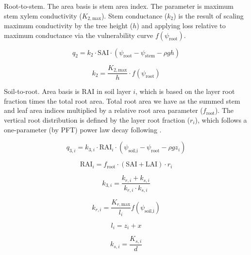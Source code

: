 \documentclass[draft,linenumbers]{agujournal}
\begin{document}
Root-to-stem. The area basis is stem area index. 
The parameter is maximum stem xylem conductivity ($K_{2,\text{max}}$).
Stem conductance ($k_2$) is the result of scaling maximum conductivity by the tree height ($h$)
and applying loss relative to maximum conductance via the vulnerability curve $f\left(\psi_{\text{root}}\right)$. 
\begin{linenomath*} \begin{equation}
q_2 = k_2 \cdot  \text{SAI}  \cdot \left( \psi_{\text{root}}-\psi_{\text{stem}}-\rho g h\right)
\end{equation} \end{linenomath*}
\begin{linenomath*} \begin{equation}
k_2 = \dfrac{K_{2,\text{max}}}{h} \cdot f\left(\psi_{\text{root}}\right)
\end{equation} \end{linenomath*}

Soil-to-root. Area basis is RAI in soil layer $i$, which is based on the layer root fraction times the
total root area. Total root area we have as the summed stem and leaf area indices multiplied by a relative
root area parameter ($f_{\text{root}}$).
The vertical root distribution is defined by the layer root fraction ($r_i$), which follows a one-parameter 
(by PFT) power law decay following \citet{jackson1996}.

\begin{linenomath*} \begin{equation}
q_{3,i} = k_{3,i} \cdot  \text{RAI}_i  \cdot \left( \psi_{\text{soil,i}}-\psi_{\text{root}}-\rho g z_i\right)
\end{equation} \end{linenomath*}
\begin{linenomath*} \begin{equation}
\text{RAI}_i=f_{\text{root}} \cdot \left( \text{SAI} + \text{LAI} \right) \cdot r_i
\label{eq:rai}
\end{equation} \end{linenomath*}
\begin{linenomath*} \begin{equation}
k_{3,i} = \dfrac{k_{r,i}+k_{s,i}}{k_{r,i}\cdot k_{s,i}}
\end{equation} \end{linenomath*}
\begin{linenomath*} \begin{equation}
k_{r,i} = \dfrac{K_{r,\text{max}}}{l_i} f \left(\psi_{\text{soil,i}}\right)
\end{equation} \end{linenomath*}
\begin{linenomath*} \begin{equation}
l_i = z_i + x
\end{equation} \end{linenomath*}
\begin{linenomath*} \begin{equation}
k_{s,i} = \dfrac{K_{s,i}}{d}
\end{equation} \end{linenomath*}
\end{document}
